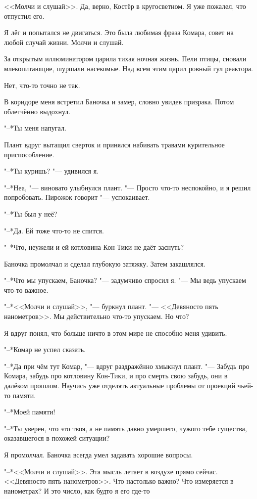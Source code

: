 \documentclass[a4paper,10pt,fleqn]{book}
\newcommand{\ldotst}{\so{...}\xspace}
\begin{document}
<<Молчи и слушай>>.
Да, верно, Костёр в кругосветном.
Я уже пожалел, что отпустил его.

Я лёг и попытался не двигаться.
Это была любимая фраза Комара, совет на любой случай жизни.
Молчи и слушай.

За открытым иллюминатором царила тихая ночная жизнь.
Пели птицы, сновали млекопитающие, шуршали насекомые.
Над всем этим царил ровный гул реактора.

Нет, что-то точно не так.

В коридоре меня встретил Баночка и замер, словно увидев призрака.
Потом облегчённо выдохнул.

"--*Ты меня напугал.

Плант вдруг вытащил сверток и принялся набивать травами курительное приспособление.

"--*Ты куришь? "--- удивился я.

"--*Неа, "--- виновато улыбнулся плант.
"--- Просто что-то неспокойно, и я решил попробовать.
Пирожок говорит "--- успокаивает.

"--*Ты был у неё?

"--*Да.
Ей тоже что-то не спится.

"--*Что, неужели и ей котловина Кон-Тики не даёт заснуть?

Баночка промолчал и сделал глубокую затяжку.
Затем закашлялся.

"--*Что мы упускаем, Баночка? "--- задумчиво спросил я.
"--- Мы ведь упускаем что-то важное.

"--*<<Молчи и слушай>>, "--- буркнул плант.
"--- <<Девяносто пять нанометров>>.
Мы действительно что-то упускаем.
Но что?

Я вдруг понял, что больше ничто в этом мире не способно меня удивить.

"--*Комар не успел сказать.

"--*Да при чём тут Комар, "--- вдруг раздражённо хмыкнул плант.
"--- Забудь про Комара, забудь про котловину Кон-Тики, и про смерть свою забудь, они в далёком прошлом.
Научись уже отделять актуальные проблемы от проекций чьей-то памяти.

"--*Моей памяти!

"--*Ты уверен, что это твоя, а не память давно умершего, чужого тебе существа, оказавшегося в похожей ситуации?

Я промолчал.
Баночка всегда умел задавать хорошие вопросы.

"--*<<Молчи и слушай>>.
Эта мысль летает в воздухе прямо сейчас.
<<Девяносто пять нанометров>>.
Что настолько важно?
Что измеряется в нанометрах?
И это число, как будто я его где-то\ldotst
\end{document}
